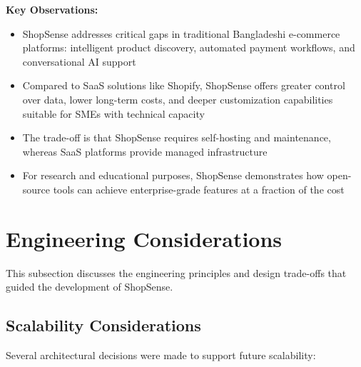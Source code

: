 \textbf{Key Observations:}
\begin{itemize}
  \item ShopSense addresses critical gaps in traditional Bangladeshi e-commerce platforms: intelligent product discovery, automated payment workflows, and conversational AI support
  \item Compared to SaaS solutions like Shopify, ShopSense offers greater control over data, lower long-term costs, and deeper customization capabilities suitable for SMEs with technical capacity
  \item The trade-off is that ShopSense requires self-hosting and maintenance, whereas SaaS platforms provide managed infrastructure
  \item For research and educational purposes, ShopSense demonstrates how open-source tools can achieve enterprise-grade features at a fraction of the cost
\end{itemize}

\section{Engineering Considerations}
This subsection discusses the engineering principles and design trade-offs that guided the development of ShopSense.

\subsection*{Scalability Considerations}
Several architectural decisions were made to support future scalability:

